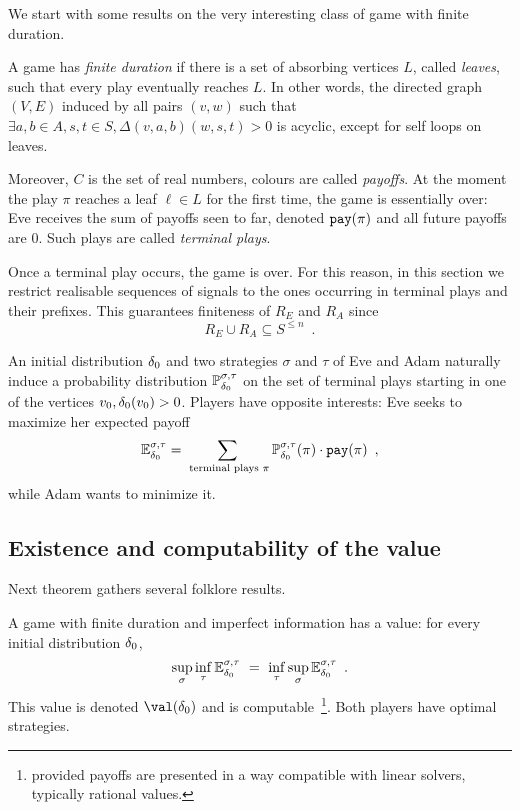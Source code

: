 We start with some results on the very interesting class of game
with finite duration.

A game has \emph{finite duration}
if there is a set of absorbing vertices $L$, called \emph{leaves},
such that every play eventually reaches $L$.
In other words, the directed graph $(V,E)$ induced by all pairs $(v,w)$
such that 
$\exists a,b\in A, s,t \in S, \Delta(v,a,b)(w,s,t) > 0$
is acyclic, except for self loops on leaves.

Moreover, $C$ is the set of real numbers,
colours are called \emph{payoffs}.
At the moment the play $\pi$ reaches a leaf $\ell\in L$
for the first time,
the game is essentially over:
Eve receives the sum of payoffs seen to far,
denoted ${\tt pay}(\pi)$ and all future payoffs are $0$.
Such plays are called \emph{terminal plays}.

Once a terminal play occurs, the game is over.
For this reason, in this section we restrict realisable sequences of signals
to the ones occurring in terminal plays and their prefixes.
This guarantees finiteness of $R_E$ and $R_A$ since
\[
R_E \cup R_A \subseteq S^{\leq n}\enspace.
\]


An initial distribution $\delta_0$ and two strategies $\sigma$ and $\tau$ of Eve and Adam naturally induce a probability distribution $\mathbb{P}_{\delta_0}^{\sigma,\tau}$
on the set of terminal plays starting in one of the vertices $v_0, \delta_0(v_0)>0$.
Players have opposite interests:
Eve seeks to maximize her expected payoff
\[
\mathbb{E}_{\delta_0}^{\sigma,\tau}= \sum_{\text{ terminal plays }\pi} 
\mathbb{P}_{\delta_0}^{\sigma,\tau}(\pi) \cdot { {\tt pay}}(\pi)\enspace,
\]
while Adam wants to minimize it.


\subsection{Existence and computability of the value}

Next theorem gathers several folklore results.

\begin{theorem}\label{thm:finiteimperfecthaveval}
A game with finite duration and imperfect information has a value:
for every initial distribution $\delta_0$,
\[
\sup_\sigma \inf_\tau \mathbb{E}_{\delta_0}^{\sigma,\tau}
~=~
 \inf_\tau \sup_\sigma \mathbb{E}_{\delta_0}^{\sigma,\tau}\enspace.
\]
This value is denoted $\val(\ini)$
and is computable~\footnote{provided payoffs are presented in a way
compatible with linear solvers, typically 
rational values.}.
Both players have optimal strategies.
\end{theorem}


